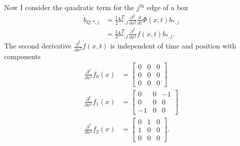 \documentclass[12pt]{article}
\begin{document}
Now I consider the quadratic term for the $j^{\text{th}}$ edge of a
box
\begin{subequations}
  \begin{align}
    \dot b_{Q;*,j} &= \frac{1}{2} b_{*,j}^T \frac{\partial^2}{\partial x^2}
               \frac{d}{dt} \Phi(x, t) b_{*,j} \\
             &= \frac{1}{2} b_{*,j}^T \frac{\partial^2}{\partial x^2}
               f(x,t) b_{*,j}.
  \end{align}
\end{subequations}
The second derivative $\frac{\partial^2}{\partial x^2} f(x,t)$ is
independent of time and position with components
\begin{subequations}
  \begin{align}
    \frac{\partial^2}{\partial x^2}
             f_0(x) &= 
                      \begin{bmatrix}
                        0 & 0 & 0 \\
                        0 & 0 & 0 \\
                        0 & 0 & 0
                      \end{bmatrix} \\
    \frac{\partial^2}{\partial x^2}
             f_1(x) &=
                      \begin{bmatrix}
                        0 & 0 & -1 \\
                        0 & 0 & 0 \\
                        -1 & 0 & 0
                      \end{bmatrix} \\
    \frac{\partial^2}{\partial x^2}
             f_2(x) &=
                      \begin{bmatrix}
                        0 & 1 & 0 \\
                        1 & 0 & 0 \\
                        0 & 0 & 0
                      \end{bmatrix}.
  \end{align}
\end{subequations}
\end{document}

